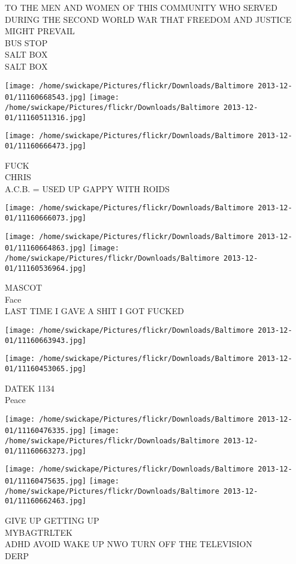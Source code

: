 \documentclass[10pt,letterpaper]{article}
\begin{document}
TO THE MEN AND WOMEN OF THIS COMMUNITY WHO SERVED DURING THE SECOND WORLD WAR THAT FREEDOM AND JUSTICE MIGHT PREVAIL\\
BUS STOP\\
SALT BOX\\
SALT BOX
\pagebreak

\texttt{[image: /home/swickape/Pictures/flickr/Downloads/Baltimore 2013-12-01/11160668543.jpg]}
\texttt{[image: /home/swickape/Pictures/flickr/Downloads/Baltimore 2013-12-01/11160511316.jpg]}

\texttt{[image: /home/swickape/Pictures/flickr/Downloads/Baltimore 2013-12-01/11160666473.jpg]}

FUCK\\
CHRIS\\
A.C.B. = USED UP GAPPY WITH ROIDS
\pagebreak

\texttt{[image: /home/swickape/Pictures/flickr/Downloads/Baltimore 2013-12-01/11160666073.jpg]}

\vspace{0.25in}
\texttt{[image: /home/swickape/Pictures/flickr/Downloads/Baltimore 2013-12-01/11160664863.jpg]}
\texttt{[image: /home/swickape/Pictures/flickr/Downloads/Baltimore 2013-12-01/11160536964.jpg]}

MASCOT\\
Face\\
LAST TIME I GAVE A SHIT I GOT FUCKED
\pagebreak

\texttt{[image: /home/swickape/Pictures/flickr/Downloads/Baltimore 2013-12-01/11160663943.jpg]}

\vspace{0.25in}
\texttt{[image: /home/swickape/Pictures/flickr/Downloads/Baltimore 2013-12-01/11160453065.jpg]}

DATEK 1134\\
Peace
\pagebreak

\texttt{[image: /home/swickape/Pictures/flickr/Downloads/Baltimore 2013-12-01/11160476335.jpg]}
\texttt{[image: /home/swickape/Pictures/flickr/Downloads/Baltimore 2013-12-01/11160663273.jpg]}

\texttt{[image: /home/swickape/Pictures/flickr/Downloads/Baltimore 2013-12-01/11160475635.jpg]}
\texttt{[image: /home/swickape/Pictures/flickr/Downloads/Baltimore 2013-12-01/11160662463.jpg]}

GIVE UP GETTING UP\\
MYBAGTRLTEK\\
ADHD AVOID WAKE UP NWO TURN OFF THE TELEVISION\\
DERP
\pagebreak
\end{document}
